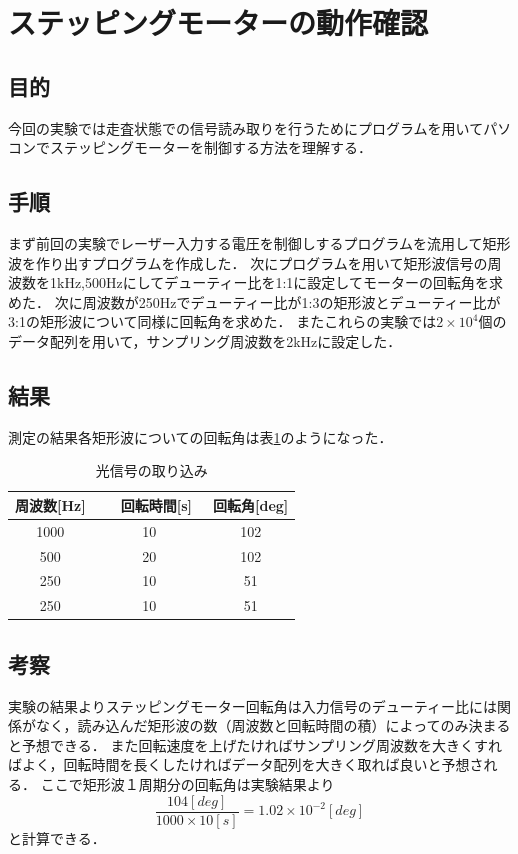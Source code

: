 \documentclass[11pt, a4paper,twocolumn]{jarticle}
\begin{document}
\section{ステッピングモーターの動作確認}
\subsection{目的}
今回の実験では走査状態での信号読み取りを行うためにプログラムを用いてパソコンでステッピングモーターを制御する方法を理解する．

\subsection{手順}
まず前回の実験でレーザー入力する電圧を制御しするプログラムを流用して矩形波を作り出すプログラムを作成した．
次にプログラムを用いて矩形波信号の周波数を1kHz,500Hzにしてデューティー比を1:1に設定してモーターの回転角を求めた．
次に周波数が250Hzでデューティー比が1:3の矩形波とデューティー比が3:1の矩形波について同様に回転角を求めた．
またこれらの実験では$2\times{10^4}$個のデータ配列を用いて，サンプリング周波数を2kHzに設定した．

\subsection{結果}
測定の結果各矩形波についての回転角は表\ref{fig:hogehoge}のようになった．

\begin{table}[ht]
\centering
\caption{光信号の取り込み}
\label{my-label}
\begin{tabular}{c c c}
\hline
周波数[Hz] &　回転時間[s]　& 回転角[deg] \\ \hline
1000 & 10 & 102 \\
500 & 20 & 102 \\
250 & 10 & 51 \\
250 & 10 & 51 \\
\end{tabular}
\label{fig:hogehoge}
\end{table}

\newpage


\subsection{考察}
実験の結果よりステッピングモーター回転角は入力信号のデューティー比には関係がなく，読み込んだ矩形波の数（周波数と回転時間の積）によってのみ決まると予想できる．
また回転速度を上げたければサンプリング周波数を大きくすればよく，回転時間を長くしたければデータ配列を大きく取れば良いと予想される．
ここで矩形波１周期分の回転角は実験結果より
\begin{equation}
    \frac{104[deg]}{1000 \times10[s]} = 1.02 \times{10^{-2}}[deg]
\end{equation}
と計算できる．
\end{document}
